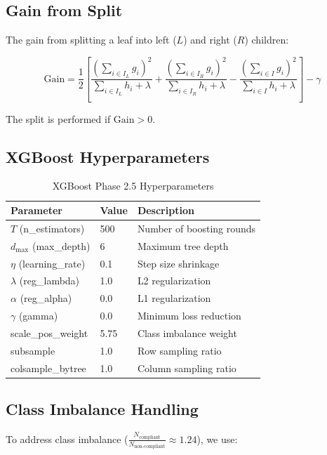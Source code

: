 \documentclass[12pt,a4paper]{article}
\begin{document}
\subsection{Gain from Split}

The gain from splitting a leaf into left ($L$) and right ($R$) children:

$$\text{Gain} = \frac{1}{2} \left[ \frac{(\sum_{i \in I_L} g_i)^2}{\sum_{i \in I_L} h_i + \lambda} + \frac{(\sum_{i \in I_R} g_i)^2}{\sum_{i \in I_R} h_i + \lambda} - \frac{(\sum_{i \in I} g_i)^2}{\sum_{i \in I} h_i + \lambda} \right] - \gamma$$

The split is performed if $\text{Gain} > 0$.

\subsection{XGBoost Hyperparameters}

\begin{table}[h]
\centering
\begin{tabular}{lll}
\toprule
\textbf{Parameter} & \textbf{Value} & \textbf{Description} \\
\midrule
$T$ (n\_estimators) & 500 & Number of boosting rounds \\
$d_{\text{max}}$ (max\_depth) & 6 & Maximum tree depth \\
$\eta$ (learning\_rate) & 0.1 & Step size shrinkage \\
$\lambda$ (reg\_lambda) & 1.0 & L2 regularization \\
$\alpha$ (reg\_alpha) & 0.0 & L1 regularization \\
$\gamma$ (gamma) & 0.0 & Minimum loss reduction \\
scale\_pos\_weight & 5.75 & Class imbalance weight \\
subsample & 1.0 & Row sampling ratio \\
colsample\_bytree & 1.0 & Column sampling ratio \\
\bottomrule
\end{tabular}
\caption{XGBoost Phase 2.5 Hyperparameters}
\end{table}

\subsection{Class Imbalance Handling}

To address class imbalance ($\frac{N_{\text{compliant}}}{N_{\text{non-compliant}}} \approx 1.24$), we use:
\end{document}
